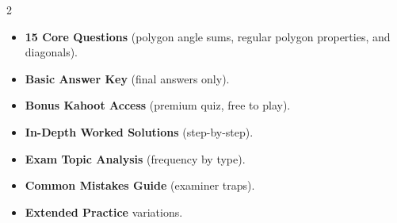 \documentclass[11pt,a4paper]{article}
\newcommand{\FullReleaseDate}{April 30, 2026}
\begin{document}
\vspace{8pt}

\begin{multicols}{2}
  \begin{tcolorbox}[card, title=\sffamily\bfseries\textcolor{white}{\faHandPointDown\ TODAY (Simplified Version)}, colbacktitle=mainblue, boxed title style={sharp corners, boxrule=0pt}]
    \begin{itemize}[leftmargin=1.2em, itemsep=2pt]
      \item \small \textbf{15 Core Questions} (polygon angle sums, regular polygon properties, and diagonals).
      \item \small \textbf{Basic Answer Key} (final answers only).
      \item \small \textbf{Bonus Kahoot Access} (premium quiz, free to play).
    \end{itemize}
  \end{tcolorbox}

  \columnbreak

  \begin{tcolorbox}[card, title=\sffamily\bfseries\textcolor{white}{\faRocket\ ON \FullReleaseDate\ (Full Upgrade)}, colbacktitle=mainblue, boxed title style={sharp corners, boxrule=0pt}]
    \begin{itemize}[leftmargin=1.2em, itemsep=2pt]
      \item \small \textbf{In-Depth Worked Solutions} (step-by-step).
      \item \small \textbf{Exam Topic Analysis} (frequency by type).
      \item \small \textbf{Common Mistakes Guide} (examiner traps).
      \item \small \textbf{Extended Practice} variations.
    \end{itemize}
  \end{tcolorbox}
\end{multicols}
\end{document}
